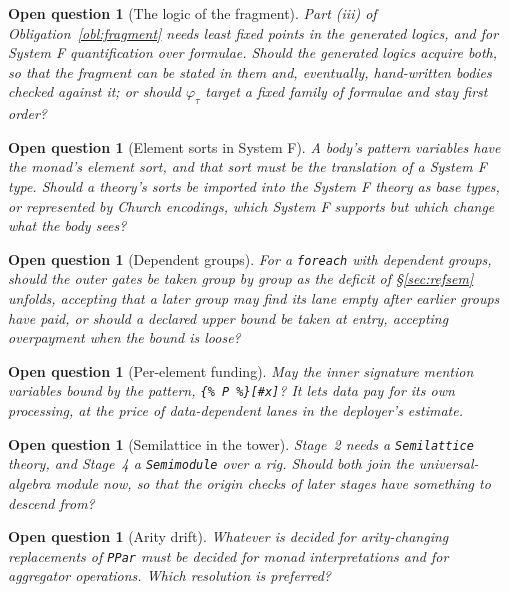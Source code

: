 \documentclass[11pt]{article}
\theoremstyle{branddef}
\theoremstyle{brandplain}
\theoremstyle{brandrem}
\newtheorem{question}[definition]{Open question}
\newcommand{\fe}{\texttt{foreach}}
\begin{document}
\begin{question}[The logic of the fragment]
\label{q:logic}
Part (iii) of Obligation~\ref{obl:fragment} needs least fixed points in the
generated logics, and for System F quantification over formulae. Should the
generated logics acquire both, so that the fragment can be stated in them and,
eventually, hand-written bodies checked against it; or should \(\varphi_\tau\)
target a fixed family of formulae and stay first order?
\end{question}

\begin{question}[Element sorts in System F]
A body's pattern variables have the monad's element sort, and that sort must be
the translation of a System F type. Should a theory's sorts be imported into the
System F theory as base types, or represented by Church encodings, which System
F supports but which change what the body sees?
\end{question}

\begin{question}[Dependent groups]
\label{q:dependent}
For a \fe{} with dependent groups, should the outer gates be taken group by
group as the deficit of \S\ref{sec:refsem} unfolds, accepting that a later group
may find its lane empty after earlier groups have paid, or should a declared
upper bound be taken at entry, accepting overpayment when the bound is loose?
\end{question}

\begin{question}[Per-element funding]
\label{q:hash}
May the inner signature mention variables bound by the pattern,
\verb|{% P %}[#x]|? It lets data pay for its own processing, at the price of
data-dependent lanes in the deployer's estimate.
\end{question}

\begin{question}[Semilattice in the tower]
Stage~2 needs a \texttt{Semilattice} theory, and Stage~4 a \texttt{Semimodule}
over a rig. Should both join the universal-algebra module now, so that the
origin checks of later stages have something to descend from?
\end{question}

\begin{question}[Arity drift]
Whatever is decided for arity-changing replacements of \texttt{PPar} must be
decided for monad interpretations and for aggregator operations. Which
resolution is preferred?
\end{question}
\end{document}
